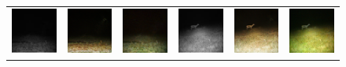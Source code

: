 \begin{figure}[htp!]
\begin{tabularx}{\textwidth}{Y Y Y !{\space} Y Y Y}
        \includegraphics{gfx/diffusion-sampling-intensity-qual/nir_S2_B06_R3_PICT3848.jpg} & \includegraphics{gfx/diffusion-sampling-intensity-qual/cyclegan_S2_B06_R3_PICT3848_fake.png} & \includegraphics{gfx/diffusion-sampling-intensity-qual/diffusion_S2_B06_R3_PICT3848.png} & \includegraphics{gfx/diffusion-sampling-intensity-qual/nir_S2_B07_R1_PICT3274.jpg} & \includegraphics{gfx/diffusion-sampling-intensity-qual/cyclegan_S2_B07_R1_PICT3274_fake.png} & \includegraphics{gfx/diffusion-sampling-intensity-qual/diffusion_S2_B07_R1_PICT3274.png}

\end{tabularx}
\end{figure}
